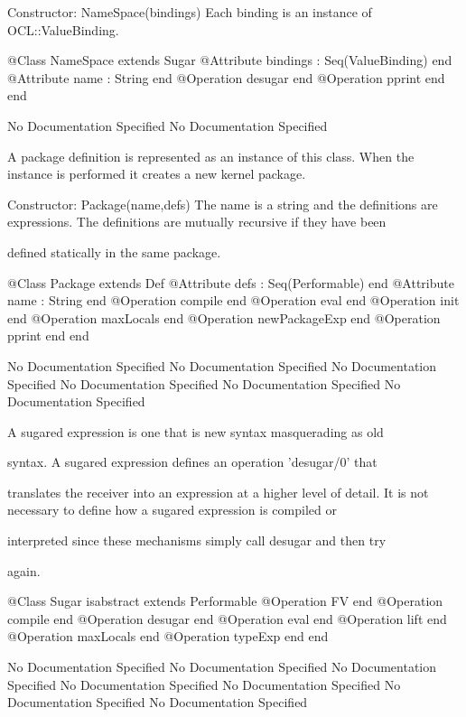        Constructor: NameSpace(bindings)
         Each binding is an instance of OCL::ValueBinding.
\begin{Interface}
@Class NameSpace extends Sugar
  @Attribute bindings : Seq(ValueBinding) end
  @Attribute name : String end
  @Operation desugar end
  @Operation pprint end
end
\end{Interface}
No Documentation Specified
No Documentation Specified

      A package definition is represented as an instance of this class.
      When the instance is performed it creates a new kernel package.
      
      Constructor: Package(name,defs)
        The name is a string and the definitions are expressions.
        The definitions are mutually recursive if they have been

        defined statically in the same package.
\begin{Interface}
@Class Package extends Def
  @Attribute defs : Seq(Performable) end
  @Attribute name : String end
  @Operation compile end
  @Operation eval end
  @Operation init end
  @Operation maxLocals end
  @Operation newPackageExp end
  @Operation pprint end
end
\end{Interface}
No Documentation Specified
No Documentation Specified
No Documentation Specified
No Documentation Specified
No Documentation Specified
No Documentation Specified

      A sugared expression is one that is new syntax masquerading as old

      syntax. A sugared expression defines an operation 'desugar/0' that

      translates the receiver into an expression at a higher level of detail.
      It is not necessary to define how a sugared expression is compiled or

      interpreted since these mechanisms simply call desugar and then try

      again.
\begin{Interface}
@Class Sugar isabstract extends Performable
  @Operation FV end
  @Operation compile end
  @Operation desugar end
  @Operation eval end
  @Operation lift end
  @Operation maxLocals end
  @Operation typeExp end
end
\end{Interface}
No Documentation Specified
No Documentation Specified
No Documentation Specified
No Documentation Specified
No Documentation Specified
No Documentation Specified
No Documentation Specified

